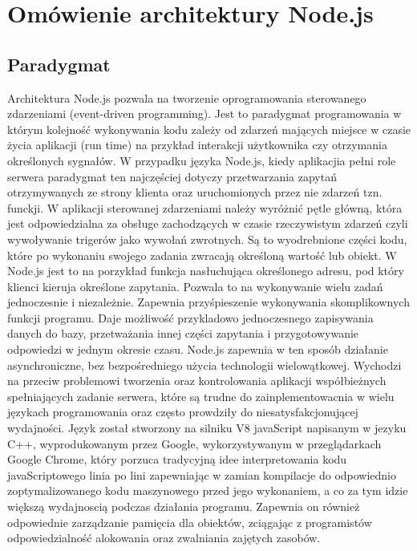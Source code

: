 \documentclass[12pt]{report}
\begin{document}
\chapter{Omówienie architektury Node.js}

\section{Paradygmat}
Architektura Node.js pozwala na tworzenie oprogramowania sterowanego zdarzeniami (event-driven programming). 
Jest to paradygmat programowania w którym kolejność wykonywania kodu zależy od zdarzeń mających miejsce w czasie życia aplikacji (run time) na przykład interakcji użytkownika czy otrzymania określonych sygnałów. 
W przypadku języka Node.js, kiedy aplikacjia pełni role serwera paradygmat ten najczęściej dotyczy przetwarzania zapytań otrzymywanych ze strony klienta oraz uruchomionych przez nie zdarzeń tzn. funckji. 
W aplikacji sterowanej zdarzeniami należy wyróżnić pętle główną, która jest odpowiedzialna za obsługe zachodzących w czasie rzeczywistym zdarzeń czyli wywoływanie trigerów jako wywołań zwrotnych. 
Są to wyodrebnione części kodu, które po wykonaniu swojego zadania zwracają określoną wartość lub obiekt. 
W Node.js jest to na porzykład funkcja nasłuchująca określonego adresu, pod który klienci kieruja określone zapytania. 
Pozwala to na wykonywanie wielu zadań jednoczesnie i niezależnie. 
Zapewnia przyśpieszenie wykonywania skomplikownych funkcji programu. 
Daje możliwość przykladowo jednoczesnego zapisywania danych do bazy, przetważania innej części zapytania i przygotowywanie odpowiedzi w jednym okresie czasu. 
Node.js zapewnia w ten sposób działanie asynchroniczne, bez bezpośredniego użycia technologii wielowątkowej. 
Wychodzi na przeciw problemowi tworzenia oraz kontrolowania aplikacji współbieżnych spełniających zadanie serwera, które są trudne do zainplementowacnia w wielu językach programowania oraz często prowdziły do niesatysfakcjonującej wydajności. 
Język został stworzony na silniku V8 javaScript napisanym w jezyku C++, wyprodukowanym przez Google, wykorzystywanym w przeglądarkach Google Chrome, który porzuca tradycyjną idee interpretowania kodu javaScriptowego linia po lini zapewniając w zamian kompilacje do odpowiednio zoptymalizowanego kodu maszynowego przed jego wykonaniem, a co za tym idzie większą wydajnoscią podczas działania programu. 
Zapewnia on również odpowiednie zarządzanie pamięcia dla obiektów, zciągając z programistów odpowiedzialność alokowania oraz zwalniania zajętych zasobów.
\end{document}
